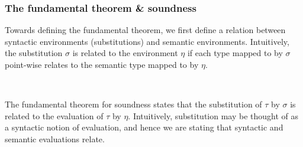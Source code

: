 \documentclass[authoryear, acmsmall, screen, review, nonacm]{acmart}
\begin{document}
\subsubsection{The fundamental theorem \& soundness}

Towards defining the fundamental theorem, we first define a relation between syntactic environments (substitutions) and semantic environments. Intuitively, the substitution $\sigma$ is related to the environment $\eta$ if each type mapped to by $\sigma$ point-wise relates to the semantic type mapped to by $\eta$.

\begin{code}%
\>[0]\AgdaSpace{}%
\AgdaSymbol{:}\AgdaSpace{}%
\AgdaSpace{}%
\AgdaSymbol{\{}\AgdaSpace{}%
\AgdaSymbol{\}}\AgdaSpace{}%
\AgdaSpace{}%
\AgdaSpace{}%
\AgdaSpace{}%
\AgdaSpace{}%
\AgdaSpace{}%
\AgdaSpace{}%
\AgdaSpace{}%
\AgdaSpace{}%
\AgdaSpace{}%
\<%
\\
\>[0]\AgdaSpace{}%
\AgdaSymbol{\{}\AgdaSymbol{\}}\AgdaSpace{}%
\AgdaSpace{}%
\AgdaSpace{}%
\AgdaSymbol{=}\AgdaSpace{}%
\AgdaSpace{}%
\AgdaSymbol{\{}\AgdaSymbol{\}}\AgdaSpace{}%
\AgdaSymbol{(}\AgdaSpace{}%
\AgdaSymbol{:}\AgdaSpace{}%
\AgdaSpace{}%
\AgdaSpace{}%
\AgdaSymbol{)}\AgdaSpace{}%
\AgdaSpace{}%
\AgdaSpace{}%
\AgdaSymbol{(}\AgdaSpace{}%
\AgdaSymbol{)}\AgdaSpace{}%
\AgdaSpace{}%
\AgdaSymbol{(}\AgdaSpace{}%
\AgdaSymbol{)}\<%
\end{code}

The fundamental theorem for soundness states that the substitution of $\tau$ by $\sigma$ is related to the evaluation of $\tau$ by $\eta$. Intuitively, substitution may be thought of as a syntactic notion of evaluation, and hence we are stating that syntactic and semantic evaluations relate.
\end{document}
